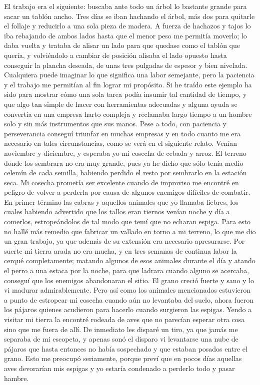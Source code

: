 \documentclass{novela}
\begin{document}
    El trabajo era el siguiente: buscaba ante todo un árbol lo bastante grande para sacar un tablón ancho. Tres días se iban hachando el árbol, más dos para quitarle el follaje y reducirlo a una sola pieza de madera. A fuerza de hachazos y tajos lo iba rebajando de ambos lados hasta que el menor peso me permitía moverlo; lo daba vuelta y trataba de alisar un lado para que quedase como el tablón que quería, y volviéndolo a cambiar de posición alisaba el lado opuesto hasta conseguir la plancha deseada, de unas tres pulgadas de espesor y bien nivelada. Cualquiera puede imaginar lo que significa una labor semejante, pero la paciencia y el trabajo me permitían al fin lograr mi propósito. Si he traído este ejemplo ha sido para mostrar cómo una sola tarea podía insumir tal cantidad de tiempo, y que algo tan simple de hacer con herramientas adecuadas y alguna ayuda se convertía en una empresa harto compleja y reclamaba largo tiempo a un hombre solo y sin más instrumentos que sus manos. Pese a todo, con paciencia y perseverancia conseguí triunfar en muchas empresas y en todo cuanto me era necesario en tales circunstancias, como se verá en el siguiente relato.
    Venían noviembre y diciembre, y esperaba yo mi cosecha de cebada y arroz. El terreno donde los sembrara no era muy grande, pues ya he dicho que sólo tenía medio celemín de cada semilla, habiendo perdido el resto por sembrarlo en la estación seca. Mi cosecha prometía ser excelente cuando de improviso me encontré en peligro de volver a perderla por causa de algunos enemigos difíciles de combatir. En primer término las cabras y aquellos animales que yo llamaba liebres, los cuales habiendo advertido que los tallos eran tiernos venían noche y día a comerlos, estropeándolos de tal modo que temí que no echaran espiga.
    Para esto no hallé más remedio que fabricar un vallado en torno a mi terreno, lo que me dio un gran trabajo, ya que además de su extensión era necesario apresurarse. Por suerte mi tierra arada no era mucha, y en tres semanas de continua labor la cerqué completamente; matando algunos de esos animales durante el día y atando el perro a una estaca por la noche, para que ladrara cuando alguno se acercaba, conseguí que los enemigos abandonaran el sitio. El grano creció fuerte y sano y lo vi madurar admirablemente.
    Pero así como los animales mencionados estuvieron a punto de estropear mi cosecha cuando aún no levantaba del suelo, ahora fueron los pájaros quienes acudieron para hacerlo cuando surgieron las espigas. Yendo a visitar mi tierra la encontré rodeada de aves que no parecían esperar otra cosa sino que me fuera de allí. De inmediato les disparé un tiro, ya que jamás me separaba de mi escopeta, y apenas sonó el disparo vi levantarse una nube de pájaros que hasta entonces no había sospechado y que estaban posados entre el grano. Esto me preocupó seriamente, porque preví que en pocos días aquellas aves devorarían mis espigas y yo estaría condenado a perderlo todo y pasar hambre.
\end{document}
